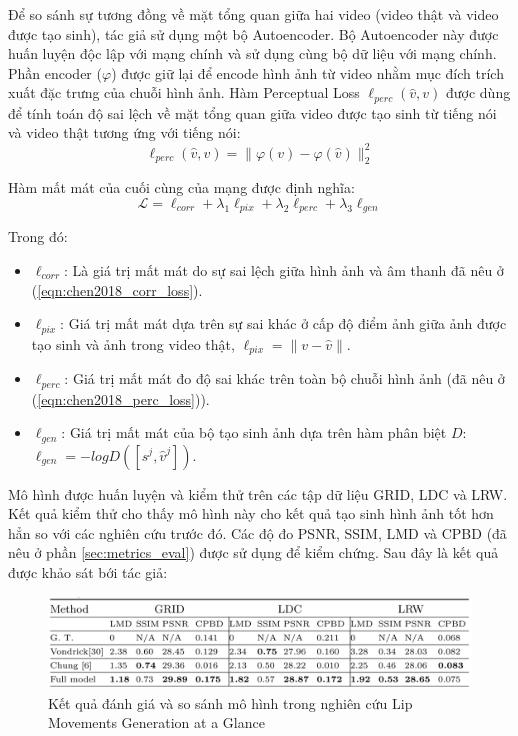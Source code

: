 Để so sánh sự tương đồng về mặt tổng quan giữa hai video (video thật và video được tạo sinh), tác giả sử dụng một bộ Autoencoder. Bộ Autoencoder này được huấn luyện độc lập với mạng chính và sử dụng cùng bộ dữ liệu với mạng chính. Phần encoder ($\varphi$) được giữ lại để encode hình ảnh từ video nhằm mục đích trích xuất đặc trưng của chuỗi hình ảnh. Hàm Perceptual Loss $\ell_{perc}(\hat{v}, v)$ được dùng để tính toán độ sai lệch về mặt tổng quan giữa video được tạo sinh từ tiếng nói và video thật tương ứng với tiếng nói:
\begin{equation}
    \ell_{perc}(\hat{v}, v) = \|\varphi(v) - \varphi(\hat{v})\|^2_2
    \label{eqn:chen2018_perc_loss}
\end{equation}

Hàm mất mát của cuối cùng của mạng được định nghĩa:
\begin{equation}
    \mathcal{L} = \ell_{corr} + \lambda_1\ell_{pix} + \lambda_2\ell_{perc} + \lambda_3\ell_{gen}
    \label{eqn:chen2018_loss}
\end{equation}

Trong đó:
\begin{itemize}
\item $\ell_{corr}$: Là giá trị mất mát do sự sai lệch giữa hình ảnh và âm thanh đã nêu ở (\ref{eqn:chen2018_corr_loss}).
\item $\ell_{pix}$: Giá trị mất mát dựa trên sự sai khác ở cấp độ điểm ảnh giữa ảnh được tạo sinh và ảnh trong video thật, $\ell_{pix} = \|v-\hat{v}\|$.
\item $\ell_{perc}$: Giá trị mất mát đo độ sai khác trên toàn bộ chuỗi hình ảnh (đã nêu ở (\ref{eqn:chen2018_perc_loss})).
\item $\ell_{gen}$: Giá trị mất mát của bộ tạo sinh ảnh dựa trên hàm phân biệt $D$: $\ell_{gen} = -logD([s^j, \hat{v}^j])$.
\end{itemize}

Mô hình được huấn luyện và kiểm thử trên các tập dữ liệu GRID, LDC và LRW. Kết quả kiểm thử cho thấy mô hình này cho kết quả tạo sinh hình ảnh tốt hơn hẳn so với các nghiên cứu trước đó. Các độ đo PSNR, SSIM, LMD và CPBD (đã nêu ở phần \ref{sec:metrics_eval}) được sử dụng để kiểm chứng. Sau đây là kết quả được khảo sát bới tác giả:

\begin{figure}[H]
    \centering
    \includegraphics[width=15cm]{./content/images/chen2018_result.png}
    \caption{Kết quả đánh giá và so sánh mô hình trong nghiên cứu Lip Movements Generation at a Glance}
    \label{fig:chen2018_result}
\end{figure}

